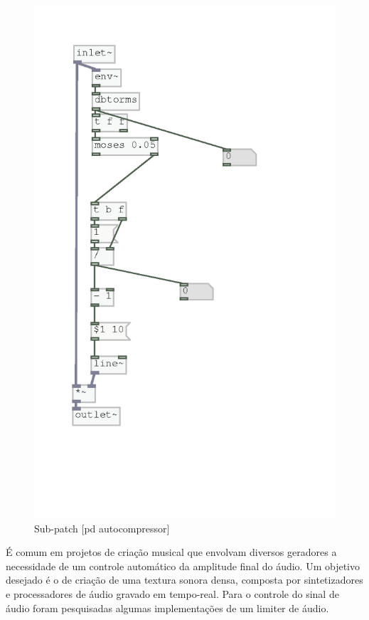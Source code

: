 \documentclass{ppgmus}
\begin{document}
\begin{figure}
\includegraphics[scale=.6]{autolimiter}
\caption{Sub-patch [pd autocompressor]}
\label{autolimiter}
\end{figure}

É comum em projetos de criação musical que envolvam diversos geradores a necessidade de um
controle automático da amplitude final do áudio. 
Um objetivo desejado é o de criação de uma textura sonora densa, composta por sintetizadores e 
processadores de áudio gravado em tempo-real. Para o controle do sinal de áudio foram pesquisadas
algumas implementações de um limiter de áudio. 
\end{document}
